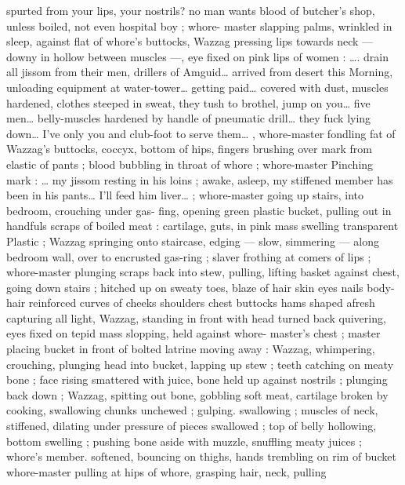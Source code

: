 spurted from your lips, your nostrils?{\td} no man wants blood of 
butcher's shop, unless boiled,{\td} not even hospital boy {\gr} ; whore- 
master slapping palms, wrinkled in sleep, against flat of whore's 
buttocks, Wazzag pressing lips towards neck --- downy in hollow 
between muscles ---, eye fixed on pink lips of women : {\gl}{\ldots}. drain all 
jissom from their men, drillers of Amguid{\ldots} arrived from desert this 
Morning, unloading equipment at water-tower{\ldots} getting paid{\ldots} 
covered with dust, muscles hardened, clothes steeped in sweat, they 
tush to brothel, jump on you{\ldots} five men{\ldots} belly-muscles hardened by 
handle of pneumatic drill{\ldots} they fuck lying down{\ldots} I've only you and 
club-foot to serve them{\ldots} {\gr}, whore-master fondling fat of Wazzag's 
buttocks, coccyx, bottom of hips, fingers brushing over mark from 
elastic of pants ; blood bubbling in throat of whore ; whore-master 
Pinching mark : {\gl} {\ldots} my jissom resting in his loins ; awake, asleep, my 
stiffened member has been in his pants{\ldots} I'll feed him liver{\ldots} {\gr} ; 
whore-master going up stairs, into bedroom, crouching under gas- 
fing, opening green plastic bucket, pulling out in handfuls scraps of 
boiled meat : cartilage, guts, in pink mass swelling transparent 
Plastic ; Wazzag springing onto staircase, edging --- slow, simmering 
--- along bedroom wall, over to encrusted gas-ring ; slaver frothing 
at comers of lips ; whore-master plunging scraps back into stew, 
pulling, lifting basket against chest, going down stairs ; hitched up 
on sweaty toes, blaze of hair skin eyes nails body-hair reinforced 
curves of cheeks shoulders chest buttocks hams shaped afresh 
capturing all light, Wazzag, standing in front with head turned back 
quivering, eyes fixed on tepid mass slopping, held against whore- 
master's chest ; master placing bucket in front of bolted latrine 
moving away : Wazzag, whimpering, crouching, plunging head into 
bucket, lapping up stew ; teeth catching on meaty bone ; face rising 
smattered with juice, bone held up against nostrils ; plunging back 
down ; Wazzag, spitting out bone, gobbling soft meat, cartilage 
broken by cooking, swallowing chunks unchewed ; gulping. 
swallowing ; muscles of neck, stiffened, dilating under pressure of 
pieces swallowed ; top of belly hollowing, bottom swelling ; pushing 
bone aside with muzzle, snuffling meaty juices ; whore's member. 
softened, bouncing on thighs, hands trembling on rim of bucket 
whore-master pulling at hips of whore, grasping hair, neck, pulling 
